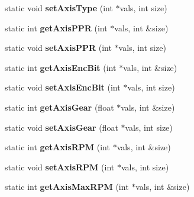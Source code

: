 \begin{DoxyCompactItemize}
\item 
\hypertarget{classRobotConf_ab471befb31366c2efeaaaba1792dd260}{static void {\bfseries set\-Axis\-Type} (int $\ast$vals, int size)}\label{classRobotConf_ab471befb31366c2efeaaaba1792dd260}

\item 
\hypertarget{classRobotConf_a004f27c98f9b94a21edd04d963b8846a}{static int {\bfseries get\-Axis\-P\-P\-R} (int $\ast$vals, int \&size)}\label{classRobotConf_a004f27c98f9b94a21edd04d963b8846a}

\item 
\hypertarget{classRobotConf_a2cae6e2a33b8e04d9b84e155345eb3d9}{static void {\bfseries set\-Axis\-P\-P\-R} (int $\ast$vals, int size)}\label{classRobotConf_a2cae6e2a33b8e04d9b84e155345eb3d9}

\item 
\hypertarget{classRobotConf_a19b9b88046f454aa1185565224ead626}{static int {\bfseries get\-Axis\-Enc\-Bit} (int $\ast$vals, int \&size)}\label{classRobotConf_a19b9b88046f454aa1185565224ead626}

\item 
\hypertarget{classRobotConf_a0fd9ce6793be2230706a1454d8996b83}{static void {\bfseries set\-Axis\-Enc\-Bit} (int $\ast$vals, int size)}\label{classRobotConf_a0fd9ce6793be2230706a1454d8996b83}

\item 
\hypertarget{classRobotConf_a5a5ff456cba5e6f4210ddacb3110107e}{static int {\bfseries get\-Axis\-Gear} (float $\ast$vals, int \&size)}\label{classRobotConf_a5a5ff456cba5e6f4210ddacb3110107e}

\item 
\hypertarget{classRobotConf_a8715f2de7311dee18413ce14847085c1}{static void {\bfseries set\-Axis\-Gear} (float $\ast$vals, int size)}\label{classRobotConf_a8715f2de7311dee18413ce14847085c1}

\item 
\hypertarget{classRobotConf_aa77de0d6e11f578d18a474cd5b7e75fc}{static int {\bfseries get\-Axis\-R\-P\-M} (int $\ast$vals, int \&size)}\label{classRobotConf_aa77de0d6e11f578d18a474cd5b7e75fc}

\item 
\hypertarget{classRobotConf_a03f92e76d759b9b480640368b8e5ac51}{static void {\bfseries set\-Axis\-R\-P\-M} (int $\ast$vals, int size)}\label{classRobotConf_a03f92e76d759b9b480640368b8e5ac51}

\item 
\hypertarget{classRobotConf_a87e035f496ca3cbee2568315237ceeba}{static int {\bfseries get\-Axis\-Max\-R\-P\-M} (int $\ast$vals, int \&size)}\label{classRobotConf_a87e035f496ca3cbee2568315237ceeba}


\end{DoxyCompactItemize}
